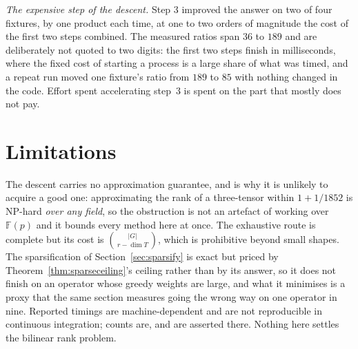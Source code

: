 \documentclass[11pt,reqno]{amsart}
\theoremstyle{plain}
\theoremstyle{definition}
\theoremstyle{remark}
\newcommand{\GF}{\mathbb{F}}
\begin{document}
\emph{The expensive step of the descent.} Step 3 improved the answer on two of
four fixtures, by one product each time, at one to two orders of magnitude the
cost of the first two steps combined. The measured ratios span $36$ to $189$ and
are deliberately not quoted to two digits: the first two steps finish in
milliseconds, where the fixed cost of starting a process is a large share of what
was timed, and a repeat run moved one fixture's ratio from $189$ to $85$ with
nothing changed in the code. Effort spent accelerating step~3 is spent on the
part that mostly does not pay.

\section{Limitations}

The descent carries no approximation guarantee, and \cite{swernofsky2018} is
why it is unlikely to acquire a good one: approximating the rank of a
three-tensor within $1 + 1/1852$ is \textsc{NP}-hard \emph{over any field}, so
the obstruction is not an artefact of working over $\GF(p)$ and it bounds every
method here at once. The exhaustive route is complete but its cost is
$\binom{|G|}{\,r-\dim T\,}$, which is prohibitive beyond small shapes. The
sparsification of Section~\ref{sec:sparsify} is exact but priced by
Theorem~\ref{thm:sparseceiling}'s ceiling rather than by its answer, so it does
not finish on an operator whose greedy weights are large, and what it minimises
is a proxy that the same section measures going the wrong way on
one operator in nine. Reported timings are machine-dependent and are not
reproducible in continuous integration; counts are, and are asserted there.
Nothing here settles the bilinear rank problem.
\end{document}
